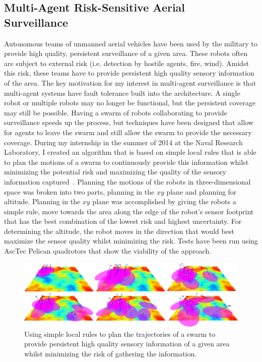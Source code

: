 \documentclass{article}
\begin{document}
\subsection{Multi-Agent Risk-Sensitive Aerial Surveillance~\cite{parcov, rover}}

Autonomous teams of unmanned aerial vehicles have been used by the military to
provide high quality, persistent surveillance of a given area. These robots
often are subject to external risk (i.e. detection by hostile agents, fire,
wind). Amidst this risk, these teams have to provide persistent high quality
sensory information of the area. The key motivation for my interest in
multi-agent surveillance is that multi-agent systems have fault tolerance built
into the architecture. A single robot or multiple robots may no longer be
functional, but the persistent coverage may still be possible. Having a swarm
of robots collaborating to provide surveillance speeds up the process, but
techniques have been designed that allow for agents to leave the swarm and
still allow the swarm to provide the necessary coverage. During my internship
in the summer of 2014 at the Naval Research Laboratory, I created an algorithm
that is based on simple local rules that is able to plan the motions of a swarm
to continuously provide this information whilst minimizing the potential risk
and maximizing the quality of the sensory information captured~\cite{parcov,
rover}. Planning the motions of the robots in three-dimensional space was
broken into two parts, planning in the $xy$ plane and planning for altitude.
Planning in the $xy$ plane was accomplished by giving the robots a simple rule,
move towards the area along the edge of the robot's sensor footprint that has
the best combination of the lowest risk and highest uncertainty. For
determining the altitude, the robot moves in the direction that would best
maximize the sensor quality whilst minimizing the risk. Tests have been run
using AscTec Pelican quadrotors that show the viability of the approach.

\begin{figure}[h!]

    \centering

    \includegraphics[width=\linewidth]{figs/rover}

    \caption{Using simple local rules to plan the trajectories of a swarm to
    provide persistent high quality sensory information of a given area whilst
minimizing the risk of gathering the information.}

    \label{fig:rover}

\end{figure}
\end{document}
